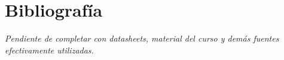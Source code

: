 \section{Bibliografía}

\textit{Pendiente de completar con datasheets, material del curso y demás fuentes efectivamente utilizadas.}
